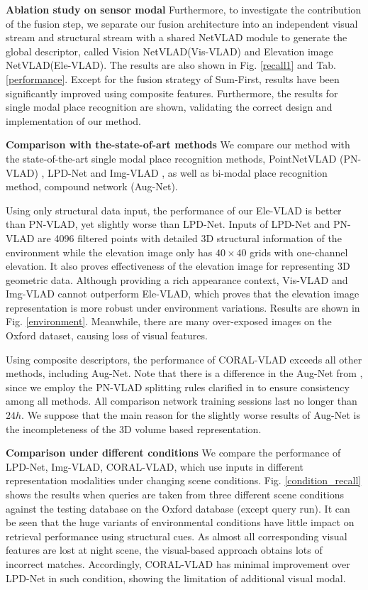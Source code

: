 \documentclass[letterpaper, 10 pt, conference]{ieeeconf}  \usepackage{tabularx}
\begin{document}
\textbf{Ablation study on sensor modal} Furthermore, to investigate the contribution of the fusion step, we separate our fusion architecture into an independent visual stream and structural stream with a shared NetVLAD module to generate the global descriptor, called Vision NetVLAD(Vis-VLAD) and Elevation image NetVLAD(Ele-VLAD). The results are also shown in Fig. \ref{recall1} and Tab. \ref{performance}. Except for the fusion strategy of Sum-First, results have been significantly improved using composite features. Furthermore, the results for single modal place recognition are shown, validating the correct design and implementation of our method. 

\textbf{Comparison with the-state-of-art methods}  We compare our method with the state-of-the-art single modal place recognition methods, PointNetVLAD (PN-VLAD) \cite{angelina2018pointnetvlad}, LPD-Net \cite{liu2019lpd} and Img-VLAD \cite{arandjelovic2016netvlad}, as well as bi-modal place recognition method, compound network (Aug-Net)\cite{oertel2020augmenting}. 

Using only structural data input, the performance of our Ele-VLAD is better than PN-VLAD, yet slightly worse than LPD-Net. Inputs of LPD-Net and PN-VLAD are 4096 filtered points with detailed 3D structural information of the environment while the elevation image only has $40\times40$ grids with one-channel elevation. It also proves effectiveness of the elevation image for representing 3D geometric data. Although providing a rich appearance context, Vis-VLAD and Img-VLAD cannot outperform Ele-VLAD, which proves that the elevation image representation is more robust under environment variations. Results are shown in Fig. \ref{environment}. Meanwhile, there are many over-exposed images on the Oxford dataset, causing loss of visual features. 

Using composite descriptors, the performance of CORAL-VLAD exceeds all other methods, including Aug-Net. Note that there is a difference in the Aug-Net from \cite{oertel2020augmenting}, since we employ the PN-VLAD splitting rules clarified in \cite{angelina2018pointnetvlad} to ensure consistency among all methods. All comparison network training sessions last no longer than $24h$. We suppose that the main reason for the slightly worse results of Aug-Net is the incompleteness of the 3D volume based representation.


\textbf{Comparison under different conditions}
We compare the performance of LPD-Net, Img-VLAD, CORAL-VLAD, which use inputs in different representation modalities under changing scene conditions. Fig. \ref{condition_recall} shows the results when queries are taken from three different scene conditions against the testing database on the Oxford database (except query run). It can be seen that the huge variants of environmental conditions have little impact on retrieval performance using structural cues. As almost all corresponding visual features are lost at night scene, the visual-based approach obtains lots of incorrect matches. Accordingly, CORAL-VLAD has minimal improvement over LPD-Net in such condition, showing the limitation of additional visual modal.
\end{document}
